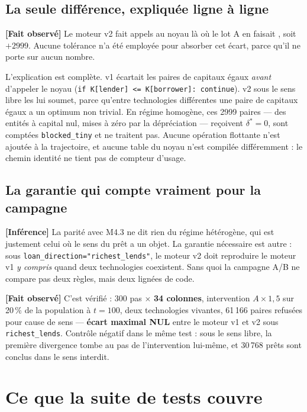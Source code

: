 \documentclass[11pt,a4paper]{article}
\newcommand{\code}[1]{\texttt{#1}}
\newcommand{\fait}{\textbf{[Fait observé]}}
\newcommand{\inference}{\textbf{[Inférence]}}
\begin{document}
\subsection{La seule différence, expliquée ligne à ligne}

\fait{} Le moteur v2 fait \parityLotBCECalls{} appels au noyau là où le lot A en
faisait \parityLotACalls{}, soit \textbf{$+2999$}. Aucune tolérance n'a été employée
pour absorber cet écart, parce qu'il ne porte sur aucun nombre.

L'explication est complète. v1 écartait les paires de capitaux égaux
\emph{avant} d'appeler le noyau (\code{if K[lender] <= K[borrower]: continue}).
v2 sous le sens libre les lui soumet, parce qu'entre technologies différentes
une paire de capitaux égaux a un optimum non trivial. En régime homogène, ces
2999 paires --- des entités à capital nul, mises à zéro par la dépréciation ---
reçoivent $\delta^{*} = 0$, sont comptées \code{blocked\_tiny} et ne traitent
pas. Aucune opération flottante n'est ajoutée à la trajectoire, et aucune table
du noyau n'est compilée différemment : le chemin identité ne tient pas de
compteur d'usage.

\subsection{La garantie qui compte vraiment pour la campagne}

\inference{} La parité avec M4.3 ne dit rien du régime hétérogène, qui est
justement celui où le sens du prêt a un objet. La garantie nécessaire est
autre : sous \code{loan\_direction="richest\_lends"}, le moteur v2 doit
reproduire le moteur v1 \emph{y compris} quand deux technologies coexistent.
Sans quoi la campagne A/B ne compare pas deux règles, mais deux lignées de code.

\fait{} C'est vérifié : 300 pas $\times$ \textbf{34 colonnes}, intervention
$A \times 1{,}5$ sur 20\,\% de la population à $t = 100$, deux technologies
vivantes, 61\,166 paires refusées pour cause de sens --- \textbf{écart
maximal NUL} entre le moteur v1 et v2 sous \code{richest\_lends}. Contrôle
négatif dans le même test : sous le sens libre, la première divergence tombe au
pas de l'intervention lui-même, et 30\,768 prêts sont conclus dans le sens
interdit.

\section{Ce que la suite de tests couvre}
\end{document}
